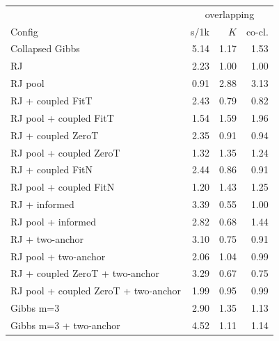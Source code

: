 \begin{tabular}{l rrr }
\toprule
 & \multicolumn{3}{c}{overlapping} \\
Config & s/1k & $K$ & co-cl. \\
\midrule
Collapsed Gibbs & 5.14 & 1.17 & 1.53 \\
RJ & 2.23 & 1.00 & 1.00 \\
RJ pool & 0.91 & 2.88 & 3.13 \\
RJ + coupled FitT & 2.43 & 0.79 & 0.82 \\
RJ pool + coupled FitT & 1.54 & 1.59 & 1.96 \\
RJ + coupled ZeroT & 2.35 & 0.91 & 0.94 \\
RJ pool + coupled ZeroT & 1.32 & 1.35 & 1.24 \\
RJ + coupled FitN & 2.44 & 0.86 & 0.91 \\
RJ pool + coupled FitN & 1.20 & 1.43 & 1.25 \\
RJ + informed & 3.39 & 0.55 & 1.00 \\
RJ pool + informed & 2.82 & 0.68 & 1.44 \\
RJ + two-anchor & 3.10 & 0.75 & 0.91 \\
RJ pool + two-anchor & 2.06 & 1.04 & 0.99 \\
RJ + coupled ZeroT + two-anchor & 3.29 & 0.67 & 0.75 \\
RJ pool + coupled ZeroT + two-anchor & 1.99 & 0.95 & 0.99 \\
Gibbs m=3 & 2.90 & 1.35 & 1.13 \\
Gibbs m=3 + two-anchor & 4.52 & 1.11 & 1.14 \\
\bottomrule
\end{tabular}
